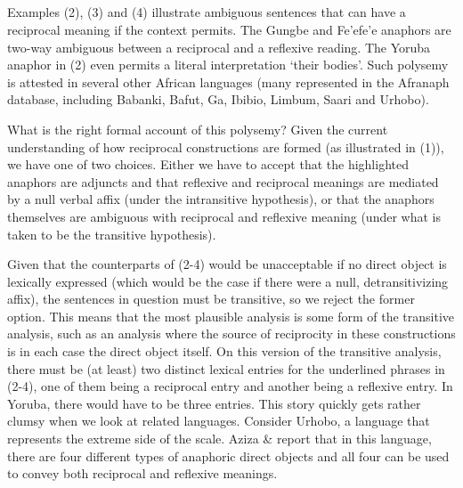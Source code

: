 \begin{listWWviiiNumxlileveli}
\item \ea\label{ex:}
\\
\ea\label{ex:}
\\
\ea\label{ex:}
\\
\ea\label{ex:}
\\
\end{listWWviiiNumxlileveli}

Examples (2), (3) and (4) illustrate ambiguous sentences that can have a reciprocal meaning if the context permits. The Gungbe and Fe'efe'e anaphors are two-way ambiguous between a reciprocal and a reflexive reading. The Yoruba anaphor in (2) even permits a literal interpretation ‘their bodies’. Such polysemy is attested in several other African languages (many represented in the Afranaph database, including Babanki, Bafut, Ga, Ibibio, Limbum, Saari and Urhobo).

  What is the right formal account of this polysemy? Given the current understanding of how reciprocal constructions are formed (as illustrated in (1)), we have one of two choices. Either we have to accept that the highlighted anaphors are adjuncts and that reflexive and reciprocal meanings are mediated by a null verbal affix (under the intransitive hypothesis), or that the anaphors themselves are ambiguous with reciprocal and reflexive meaning (under what is taken to be the transitive hypothesis). 

  Given that the counterparts of (2-4) would be unacceptable if no direct object is lexically expressed (which would be the case if there were a null, detransitivizing affix), the sentences in question must be transitive, so we reject the former option. This means that the most plausible analysis is some form of the transitive analysis, such as an analysis where the source of reciprocity in these constructions is in each case the direct object itself. On this version of the transitive analysis, there must be (at least) two distinct lexical entries for the underlined phrases in (2-4), one of them being a reciprocal entry and another being a reflexive entry. In Yoruba, there would have to be three entries. This story quickly gets rather clumsy when we look at related languages. Consider Urhobo, a language that represents the extreme side of the scale. Aziza \& \citet{Safir2006} report that in this language, there are four different types of anaphoric direct objects and all four can be used to convey both reciprocal and reflexive meanings. 

